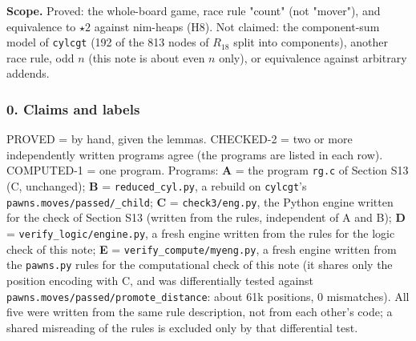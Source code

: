 \textbf{Scope.} Proved: the whole-board game, race rule "count" (not "mover"), and equivalence to $\star2$ against nim-heaps (H8). Not claimed: the component-sum model of \texttt{cylcgt} (192 of the 813 nodes of $R_{18}$ split into components), another race rule, odd $n$ (this note is about even $n$ only), or equivalence against arbitrary addends.

\subsubsection*{0. Claims and labels}
PROVED = by hand, given the lemmas. CHECKED-2 = two or more independently written programs agree (the programs are listed in each row). COMPUTED-1 = one program. Programs: \textbf{A} = the program \texttt{rg.c} of Section S13 (C, unchanged); \textbf{B} = \texttt{reduced\_cyl.py}, a rebuild on \texttt{cylcgt}'s \texttt{pawns.moves/passed/\_child}; \textbf{C} = \texttt{check3/eng.py}, the Python engine written for the check of Section S13 (written from the rules, independent of A and B); \textbf{D} = \texttt{verify\_logic/engine.py}, a fresh engine written from the rules for the logic check of this note; \textbf{E} = \texttt{verify\_compute/myeng.py}, a fresh engine written from the \texttt{pawns.py} rules for the computational check of this note (it shares only the position encoding with C, and was differentially tested against \texttt{pawns.moves/passed/promote\_distance}: about 61k positions, 0 mismatches). All five were written from the same rule description, not from each other's code; a shared misreading of the rules is excluded only by that differential test.

